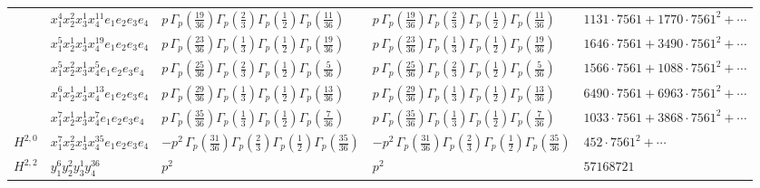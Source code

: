 \documentclass[11pt]{article}
\begin{document}
\begin{table}[ht]
{\begin{tabular}{@{}lllll@{}}
 & $x_{1}^{4} x_{2}^{2} x_{3}^{1} x_{4}^{11}  e_{1} e_{2} e_{3} e_{4}$ & $p \, \Gamma_p \left( \frac{19}{36} \right) \Gamma_p \left( \frac{2}{3} \right) \Gamma_p \left( \frac{1}{2} \right) \Gamma_p \left( \frac{11}{36} \right)$ & $p \, \Gamma_p \left( \frac{19}{36} \right) \Gamma_p \left( \frac{2}{3} \right) \Gamma_p \left( \frac{1}{2} \right) \Gamma_p \left( \frac{11}{36} \right)$ & $1131{\cdot}7561{+}1770{\cdot}7561^{2}{+}\cdots$ \\
 & $x_{1}^{5} x_{2}^{1} x_{3}^{1} x_{4}^{19}  e_{1} e_{2} e_{3} e_{4}$ & $p \, \Gamma_p \left( \frac{23}{36} \right) \Gamma_p \left( \frac{1}{3} \right) \Gamma_p \left( \frac{1}{2} \right) \Gamma_p \left( \frac{19}{36} \right)$ & $p \, \Gamma_p \left( \frac{23}{36} \right) \Gamma_p \left( \frac{1}{3} \right) \Gamma_p \left( \frac{1}{2} \right) \Gamma_p \left( \frac{19}{36} \right)$ & $1646{\cdot}7561{+}3490{\cdot}7561^{2}{+}\cdots$ \\
 & $x_{1}^{5} x_{2}^{2} x_{3}^{1} x_{4}^{5}  e_{1} e_{2} e_{3} e_{4}$ & $p \, \Gamma_p \left( \frac{25}{36} \right) \Gamma_p \left( \frac{2}{3} \right) \Gamma_p \left( \frac{1}{2} \right) \Gamma_p \left( \frac{5}{36} \right)$ & $p \, \Gamma_p \left( \frac{25}{36} \right) \Gamma_p \left( \frac{2}{3} \right) \Gamma_p \left( \frac{1}{2} \right) \Gamma_p \left( \frac{5}{36} \right)$ & $1566{\cdot}7561{+}1088{\cdot}7561^{2}{+}\cdots$ \\
 & $x_{1}^{6} x_{2}^{1} x_{3}^{1} x_{4}^{13}  e_{1} e_{2} e_{3} e_{4}$ & $p \, \Gamma_p \left( \frac{29}{36} \right) \Gamma_p \left( \frac{1}{3} \right) \Gamma_p \left( \frac{1}{2} \right) \Gamma_p \left( \frac{13}{36} \right)$ & $p \, \Gamma_p \left( \frac{29}{36} \right) \Gamma_p \left( \frac{1}{3} \right) \Gamma_p \left( \frac{1}{2} \right) \Gamma_p \left( \frac{13}{36} \right)$ & $6490{\cdot}7561{+}6963{\cdot}7561^{2}{+}\cdots$ \\
 & $x_{1}^{7} x_{2}^{1} x_{3}^{1} x_{4}^{7}  e_{1} e_{2} e_{3} e_{4}$ & $p \, \Gamma_p \left( \frac{35}{36} \right) \Gamma_p \left( \frac{1}{3} \right) \Gamma_p \left( \frac{1}{2} \right) \Gamma_p \left( \frac{7}{36} \right)$ & $p \, \Gamma_p \left( \frac{35}{36} \right) \Gamma_p \left( \frac{1}{3} \right) \Gamma_p \left( \frac{1}{2} \right) \Gamma_p \left( \frac{7}{36} \right)$ & $1033{\cdot}7561{+}3868{\cdot}7561^{2}{+}\cdots$ \\
\midrule
$H^{2,0}$ & $x_{1}^{7} x_{2}^{2} x_{3}^{1} x_{4}^{35}  e_{1} e_{2} e_{3} e_{4}$ & $- p^{2} \, \Gamma_p \left( \frac{31}{36} \right) \Gamma_p \left( \frac{2}{3} \right) \Gamma_p \left( \frac{1}{2} \right) \Gamma_p \left( \frac{35}{36} \right)$ & $- p^{2} \, \Gamma_p \left( \frac{31}{36} \right) \Gamma_p \left( \frac{2}{3} \right) \Gamma_p \left( \frac{1}{2} \right) \Gamma_p \left( \frac{35}{36} \right)$ & $452{\cdot}7561^{2}{+}\cdots$ \\
\midrule
$H^{2,2}$ & $y_{1}^{6} y_{2}^{2} y_{3}^{1} y_{4}^{36}$ & $p^{2} \,$ & $p^{2} \,$ & $57168721$ \\
\bottomrule
\end{tabular}
}
\renewcommand{\arraystretch}{1.0}
\end{table}
\end{document}
